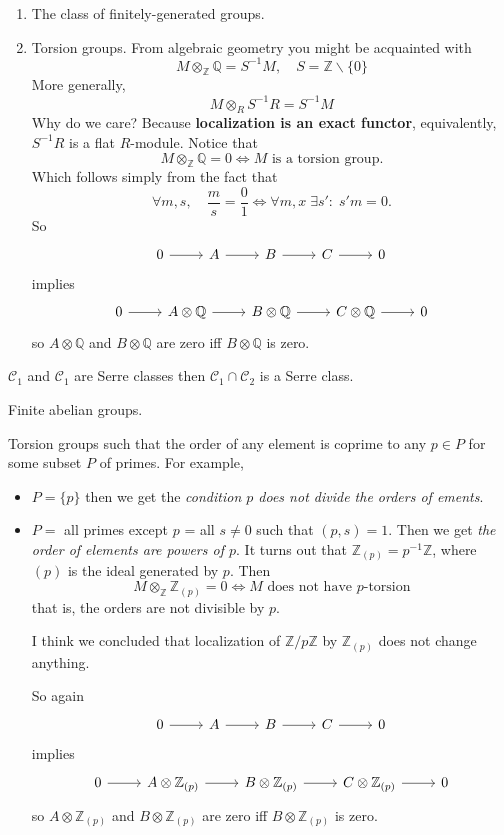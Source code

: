 \documentclass{article}
\newcommand{\Q}{\mathbb{Q}}
\newcommand{\Z}{\mathbb{Z}}
\newcommand{\Cc}{\mathcal{C}}
\begin{document}
\begin{example}\leavevmode
	\begin{enumerate}
		\item The class of finitely-generated groups.
		\item Torsion groups. From algebraic geometry you might be acquainted with
		\[M\otimes_\Z\Q=S^{-1}M,\quad S=\Z\backslash\{0\}\]
		More generally,
		\[M\otimes_RS^{-1}R=S^{-1}M\]
		Why do we care? Because \textbf{localization is an exact functor}, equivalently, $S^{-1}R$ is a flat $R$-module. Notice that
		\[M\otimes_\Z\Q=0\iff M\text{ is a torsion group.}\]
		Which follows simply from the fact that
		\[\forall m,s,\quad\frac{m}{s}=\frac{0}{1}\iff\forall m,x\;\exists s':\; s'm=0.\]
		So
			\[\begin{tikzcd}
			0\arrow[r]&A\arrow[r]&B\arrow[r]&C\arrow[r]&0
		\end{tikzcd}\]
		implies
			\[\begin{tikzcd}
			0\arrow[r]&A\otimes\Q\arrow[r]&B\otimes\Q\arrow[r]&C\otimes\Q\arrow[r]&0
		\end{tikzcd}\]
		so $A\otimes\Q$ and $B\otimes\Q$ are zero iff $B\otimes\Q$ is zero.
	\end{enumerate}
	\item $\Cc_1$ and $\Cc_1$ are Serre classes then $\Cc_1\cap\Cc_2$ is a Serre class.
	\item Finite abelian groups.
	\item Torsion groups such that the order of any element is coprime to any $p\in P$ for some subset $P$ of primes. For example,
	\begin{itemize}
		\item $P=\{p\}$ then we get the \textit{condition $p$ does not divide the orders of ements}.
		\item $P=$ all primes except $p$ = all $s\neq0$ such that $(p,s)=1$. Then we get \textit{the order of elements are powers of $p$}. It turns out that $\Z_{(p)}=p^{-1}\Z$, where $(p)$ is the ideal generated by $p$. Then
		\[M\otimes_\Z\Z_{(p)}=0\iff M\text{ does not have } p\text{-torsion}\]
		that is, the orders are not divisible by $p$.
		
		{\color{red}I think} we concluded that localization of $\Z/p\Z$ by $\Z_{(p)}$ does not change anything.
		
		So again
		\[\begin{tikzcd}
			0\arrow[r]&A\arrow[r]&B\arrow[r]&C\arrow[r]&0
		\end{tikzcd}\]
		implies
		\[\begin{tikzcd}
			0\arrow[r]&A\otimes\Z_{(p)}\arrow[r]&B\otimes\Z_{(p)}\arrow[r]&C\otimes\Z_{(p)}\arrow[r]&0
		\end{tikzcd}\]
		so $A\otimes\Z_{(p)}$ and $B\otimes\Z_{(p)}$ are zero iff $B\otimes\Z_{(p)}$ is zero.
	\end{itemize}
\end{example}
\end{document}
